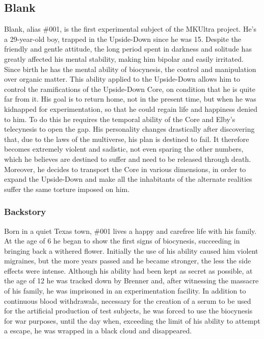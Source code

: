 \subsection{Blank}
Blank, alias \#001, is the first experimental subject of the MKUltra project. He's a 29-year-old boy, trapped in the Upside-Down since he was 15.
Despite the friendly and gentle attitude, the long period spent in darkness and solitude has greatly affected his mental stability, making him bipolar 
and easily irritated. Since birth he has the mental ability of biocynesis, the control and manipulation over organic matter. This ability applied to the 
Upside-Down allows him to control the ramifications of the Upside-Down Core, on condition that he is quite far from it.
His goal is to return home, not in the present time, but when he was kidnapped for experimentation, so that he could regain life and happiness denied to him.
To do this he requires the temporal ability of the Core and Elby's telecynesis to open the gap.
His personality changes drastically after discovering that, due to the laws of the multiverse, his plan is destined to fail. It therefore becomes extremely violent and sadistic, not even sparing the other numbers, which he believes are destined to suffer and need to be released through death. Moreover, he decides
 to transport the Core in various dimensions, in order to expand the Upside-Down and make all the inhabitants of the alternate realities suffer the same torture imposed on him.

\subsubsection{Backstory}
Born in a quiet Texas town, \#001 lives a happy and carefree life with his family. At the age of 6 he began to show the first signs of biocynesis, succeeding in 
bringing back a withered flower. Initially the use of his ability caused him violent migraines, but the more years passed and he became stronger, the less 
the side effects were intense. Although his ability had been kept as secret as possible, at the age of 12 he was tracked down by Brenner and, after 
witnessing the massacre of his family, he was imprisoned in an experimentation facility. In addition to continuous blood withdrawals, necessary for the 
creation of a serum to be used for the artificial production of test subjects, he was forced to use the biocynesis for war purposes, until the day when, 
exceeding the limit of his ability to attempt a escape, he was wrapped in a black cloud and disappeared.

